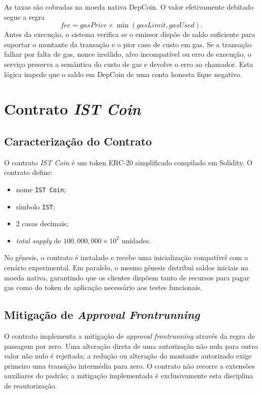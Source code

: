 \documentclass[runningheads]{llncs}
\begin{document}
As taxas s\~ao cobradas na moeda nativa DepCoin. O valor efetivamente debitado segue a regra
\[
\textit{fee} = gasPrice \times \min(gasLimit, gasUsed).
\]
Antes da execu\c{c}\~ao, o sistema verifica se o emissor disp\~oe de saldo suficiente para suportar o montante da transa\c{c}\~ao e o pior caso de custo em gas. Se a transa\c{c}\~ao falhar por falta de gas, nonce inv\'alido, alvo incompat\'ivel ou erro de execu\c{c}\~ao, o servi\c{c}o preserva a sem\^antica do custo de gas e devolve o erro ao chamador. Esta l\'ogica impede que o saldo em DepCoin de uma conta honesta fique negativo.

\section{Contrato \textit{IST Coin}}

\subsection{Caracteriza\c{c}\~ao do Contrato}
O contrato \textit{IST Coin} \'e um token ERC-20 simplificado compilado em Solidity. O contrato define:
\begin{itemize}
\item nome \texttt{IST Coin};
\item s\'imbolo \texttt{IST};
\item \(2\) casas decimais;
\item \textit{total supply} de \(100{,}000{,}000 \times 10^2\) unidades.
\end{itemize}

No g\'enesis, o contrato \'e instalado e recebe uma inicializa\c{c}\~ao compat\'ivel com o cen\'ario experimental. Em paralelo, o mesmo g\'enesis distribui saldos iniciais na moeda nativa, garantindo que os clientes disp\~oem tanto de recursos para pagar gas como do token de aplica\c{c}\~ao necess\'ario aos testes funcionais.

\subsection{Mitiga\c{c}\~ao de \textit{Approval Frontrunning}}
O contrato implementa a mitiga\c{c}\~ao de \textit{approval frontrunning} atrav\'es da regra de passagem por zero. Uma altera\c{c}\~ao direta de uma autoriza\c{c}\~ao n\~ao nula para outro valor n\~ao nulo \'e rejeitada; a redu\c{c}\~ao ou altera\c{c}\~ao do montante autorizado exige primeiro uma transi\c{c}\~ao interm\'edia para zero. O contrato n\~ao recorre a extens\~oes auxiliares do padr\~ao; a mitiga\c{c}\~ao implementada \'e exclusivamente esta disciplina de reautoriza\c{c}\~ao.
\end{document}
